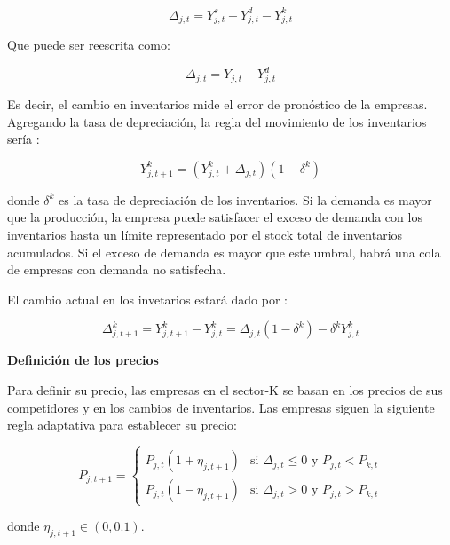 \documentclass[12pt,a4paper]{article}
\begin{document}
\begin{equation}
\Delta_{j,t} = Y_{j,t}^s-Y_{j,t}^d-Y_{j,t}^k
\end{equation}

Que puede ser reescrita como:

\begin{equation}
\Delta_{j,t} = Y_{j,t}-Y_{j,t}^d
\end{equation}

Es decir, el cambio en inventarios mide el error de pronóstico de la empresas. Agregando la tasa de depreciación, la regla del movimiento de los inventarios sería :

\begin{equation}
Y_{j,t+1}^k = (Y_{j,t}^k+ \Delta_{j,t}) (1-\delta^k)
\end{equation}

donde $\delta^k$ es la tasa de depreciación de los inventarios. Si la demanda es mayor que la producción, la empresa puede satisfacer el exceso de demanda con los inventarios hasta un límite representado por el stock total de inventarios acumulados. Si el exceso de demanda es mayor que este umbral, habrá una cola de empresas con demanda no satisfecha.

El cambio actual en los invetarios estará dado por :

\begin{equation}
\Delta_{j,t+1}^k= Y_{j,t+1}^k -Y_{j,t}^k= \Delta_{j,t}(1-\delta^k)-\delta^k Y_{j,t}^k
\end{equation}

\vspace{.2cm}
\textbf{Definición de los precios}
\vspace{.2cm}

Para definir su precio, las empresas en el sector-K se basan en los precios de sus competidores y en los cambios de inventarios. Las empresas siguen la siguiente regla adaptativa para establecer su precio:

 \begin{equation}
  P_{j,t+1} =
    \begin{cases}
   	  P_{j,t} (1+\eta_{j,t+1}) & \text{si $\Delta_{j,t} \leq 0$ y $P_{j,t} < P_{k,t}$}\\
      P_{j,t} (1 - \eta_{j,t+1}) & \text{si $\Delta_{j,t} > 0$ y $P_{j,t} > P_{k,t}$}
    \end{cases}       
\end{equation}

donde $\eta_{j,t+1}	\in (0,0.1)$.
\end{document}
